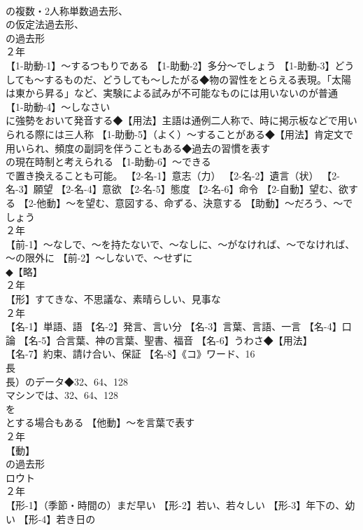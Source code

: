 \documentclass[8pt]{extreport}
\begin{document}
\begin{CJK}{UTF8}{min}
\\	の複数・2人称単数過去形、
\\	の仮定法過去形、
\\	の過去形
\\	２年	
\\	【1-助動-1】～するつもりである 【1-助動-2】多分～でしょう 【1-助動-3】どうしても～するものだ、どうしても～したがる◆物の習性をとらえる表現。「太陽は東から昇る」など、実験による試みが不可能なものには用いないのが普通 【1-助動-4】～しなさい
\\	に強勢をおいて発音する◆【用法】主語は通例二人称で、時に掲示板などで用いられる際には三人称 【1-助動-5】（よく）～することがある◆【用法】肯定文で用いられ、頻度の副詞を伴うこともある◆過去の習慣を表す 
\\	の現在時制と考えられる 【1-助動-6】～できる
\\	で置き換えることも可能。 【2-名-1】意志（力） 【2-名-2】遺言（状） 【2-名-3】願望 【2-名-4】意欲 【2-名-5】態度 【2-名-6】命令 【2-自動】望む、欲する 【2-他動】～を望む、意図する、命ずる、決意する 【助動】～だろう、～でしょう
\\	２年	
\\	【前-1】～なしで、～を持たないで、～なしに、～がなければ、～でなければ、～の限外に 【前-2】～しないで、～せずに
\\	◆【略】
\\	２年	
\\	【形】すてきな、不思議な、素晴らしい、見事な
\\	２年	
\\	【名-1】単語、語 【名-2】発言、言い分 【名-3】言葉、言語、一言 【名-4】口論 【名-5】合言葉、神の言葉、聖書、福音 【名-6】うわさ◆【用法】
\\	【名-7】約束、請け合い、保証 【名-8】《コ》ワード、16
\\	長
\\	長）のデータ◆32、64、128
\\	マシンでは、32、64、128
\\	を 
\\	とする場合もある 【他動】～を言葉で表す
\\	２年	
\\	【動】
\\	の過去形 
\\	ロウト
\\	２年	
\\	【形-1】（季節・時間の）まだ早い 【形-2】若い、若々しい 【形-3】年下の、幼い 【形-4】若き日の
\end{CJK}
\end{document}
